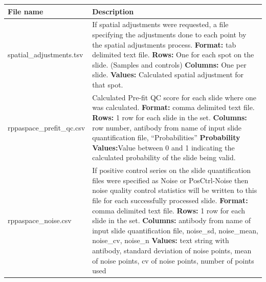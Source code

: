 \documentclass[
]{article}
\begin{document}
\begin{longtable}[]{@{}ll@{}}
\toprule
\begin{minipage}[b]{0.42\columnwidth}\raggedright
File name\strut
\end{minipage} & \begin{minipage}[b]{0.52\columnwidth}\raggedright
Description\strut
\end{minipage}\tabularnewline
\midrule
\endhead
\begin{minipage}[t]{0.42\columnwidth}\raggedright
spatial\_adjustments.tsv\strut
\end{minipage} & \begin{minipage}[t]{0.52\columnwidth}\raggedright
If spatial adjustments were requested, a file specifying the adjustments
done to each point by the spatial adjustments process. \textbf{Format:}
tab delimited text file. \textbf{Rows:} One for each spot on the slide.
(Samples and controls) \textbf{Columns:} One per slide. \textbf{Values:}
Calculated spatial adjustment for that spot.\strut
\end{minipage}\tabularnewline
\begin{minipage}[t]{0.42\columnwidth}\raggedright
rppaspace\_prefit\_qc.csv\strut
\end{minipage} & \begin{minipage}[t]{0.52\columnwidth}\raggedright
Calculated Pre-fit QC score for each slide where one was calculated.
\textbf{Format:} comma delimited text file. \textbf{Rows:} 1 row for
each slide in the set. \textbf{Columns:} row number, antibody from name
of input slide quantification file, ``Probabilities''
\textbf{Probability Values:}Value between 0 and 1 indicating the
calculated probability of the slide being valid.\strut
\end{minipage}\tabularnewline
\begin{minipage}[t]{0.42\columnwidth}\raggedright
rppaspace\_noise.csv\strut
\end{minipage} & \begin{minipage}[t]{0.52\columnwidth}\raggedright
If positive control series on the slide quantification files were
specified as Noise or PosCtrl-Noise then noise quality control
statistics will be written to this file for each successfully processed
slide. \textbf{Format:} comma delimited text file. \textbf{Rows:} 1 row
for each slide in the set. \textbf{Columns:} antibody from name of input
slide quantification file, noise\_sd, noise\_mean, noise\_cv, noise\_n
\textbf{Values:} text string with antibody, standard deviation of noise
points, mean of noise points, cv of noise points, number of points used

\end{minipage}
\end{longtable}
\end{document}
